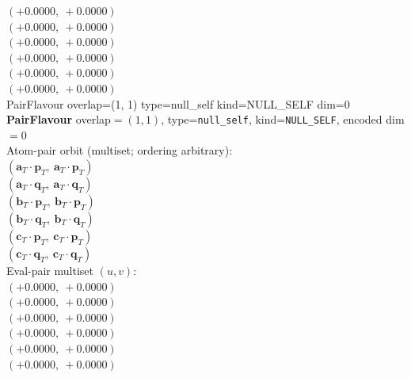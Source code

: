 \documentclass[a4paper,11pt]{article}
\newcommand{\fpbeomcfokjooi}[2]{\mathbf{#1}_T \cdot \mathbf{#2}_T}
\begin{document}
$(+0.0000,\ +0.0000)$\\
$(+0.0000,\ +0.0000)$\\
$(+0.0000,\ +0.0000)$\\
$(+0.0000,\ +0.0000)$\\
$(+0.0000,\ +0.0000)$\\
$(+0.0000,\ +0.0000)$\\
    PairFlavour  overlap=(1, 1)  type=null\_self  kind=NULL\_SELF  dim=0
\textbf{PairFlavour} overlap$=(1, 1)$, type=\texttt{null\_self}, kind=\texttt{NULL\_SELF}, encoded dim$=0$\\
\quad Atom-pair orbit (multiset; ordering arbitrary):\\
$(\fpbeomcfokjooi{a}{p},\ \fpbeomcfokjooi{a}{p})$\\
$(\fpbeomcfokjooi{a}{q},\ \fpbeomcfokjooi{a}{q})$\\
$(\fpbeomcfokjooi{b}{p},\ \fpbeomcfokjooi{b}{p})$\\
$(\fpbeomcfokjooi{b}{q},\ \fpbeomcfokjooi{b}{q})$\\
$(\fpbeomcfokjooi{c}{p},\ \fpbeomcfokjooi{c}{p})$\\
$(\fpbeomcfokjooi{c}{q},\ \fpbeomcfokjooi{c}{q})$\\
\quad Eval-pair multiset $(u, v)$:\\
$(+0.0000,\ +0.0000)$\\
$(+0.0000,\ +0.0000)$\\
$(+0.0000,\ +0.0000)$\\
$(+0.0000,\ +0.0000)$\\
$(+0.0000,\ +0.0000)$\\
$(+0.0000,\ +0.0000)$\\
\end{document}
